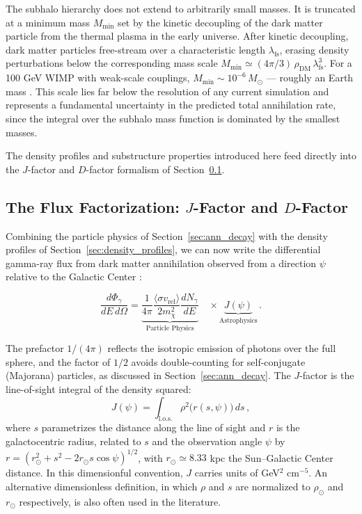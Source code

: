 The subhalo hierarchy does not extend to arbitrarily small masses.
It is truncated at a minimum mass $M_\text{min}$ set by the kinetic decoupling of the dark matter particle from the thermal plasma in the early universe.
After kinetic decoupling, dark matter particles free-stream over a characteristic length $\lambda_\text{fs}$, erasing density perturbations below the corresponding mass scale $M_\text{min} \simeq (4\pi/3)\, \rho_\text{DM}\, \lambda_\text{fs}^3$.
For a 100 GeV WIMP with weak-scale couplings, $M_\text{min} \sim 10^{-6}\, M_\odot$ --- roughly an Earth mass \cite{Cirelli:2024ssz}.
This scale lies far below the resolution of any current simulation and represents a fundamental uncertainty in the predicted total annihilation rate, since the integral over the subhalo mass function is dominated by the smallest masses.

The density profiles and substructure properties introduced here feed directly into the $J$-factor and $D$-factor formalism of Section~\ref{sec:jfactor}.

\subsection{The Flux Factorization: $J$-Factor and $D$-Factor}
\label{sec:jfactor}

Combining the particle physics of Section~\ref{sec:ann_decay} with the density profiles of Section~\ref{sec:density_profiles}, we can now write the differential gamma-ray flux from dark matter annihilation observed from a direction $\psi$ relative to the Galactic Center \cite{Cirelli:2024ssz}:

\begin{equation}
	\frac{d\Phi_\gamma}{dE\, d\Omega} = \underbrace{\frac{1}{4\pi} \frac{\langle \sigma v_\text{rel} \rangle}{2 m_\chi^2} \frac{dN_\gamma}{dE}}_{\text{Particle Physics}} \quad \times \underbrace{J(\psi)}_{\text{Astrophysics}} \,.
	\label{eq:flux_ann}
\end{equation}

The prefactor $1/(4\pi)$ reflects the isotropic emission of photons over the full sphere, and the factor of $1/2$ avoids double-counting for self-conjugate (Majorana) particles, as discussed in Section~\ref{sec:ann_decay}.
The $J$-factor is the line-of-sight integral of the density squared:
%
\begin{equation}
	J(\psi) = \int_\text{l.o.s.} \rho^2\bigl(r(s, \psi)\bigr) \, ds \,,
	\label{eq:jfactor}
\end{equation}
%
where $s$ parametrizes the distance along the line of sight and $r$ is the galactocentric radius, related to $s$ and the observation angle $\psi$ by $r = (r_\odot^2 + s^2 - 2 r_\odot s \cos\psi)^{1/2}$, with $r_\odot \simeq 8.33$ kpc the Sun--Galactic Center distance.
In this dimensionful convention, $J$ carries units of GeV$^2$ cm$^{-5}$.
An alternative dimensionless definition, in which $\rho$ and $s$ are normalized to $\rho_\odot$ and $r_\odot$ respectively, is also often used in the literature.

